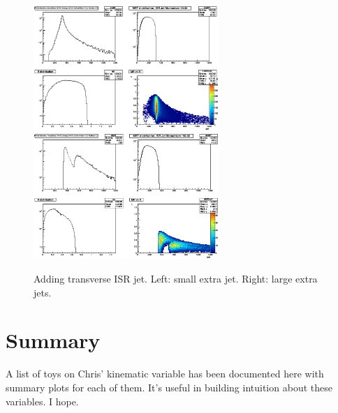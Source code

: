 \documentclass{fheadnote}
\begin{document}
\begin{figure}[htbp]
   \centering
   \includegraphics[width=7cm]{Figures/MRToy13_SmallISRJet}
   \includegraphics[width=7cm]{Figures/MRToy13_LargeISRJet}
   \caption{Adding transverse ISR jet.  Left: small extra jet.  Right: large extra jets.}
   \label{Figure_MRToy13}
\end{figure}




\section{Summary}

A list of toys on Chris' kinematic variable has been documented here with summary plots for each of them.
It's useful in building intuition about these variables.  I hope.



 
\pagebreak
\end{document}
